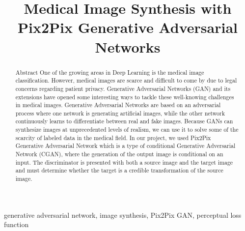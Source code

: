 \documentclass[conference]{IEEEtran}
\begin{document}
\title{Medical Image Synthesis with \\Pix2Pix Generative Adversarial Networks}


\author{
\and
{}
\and
{}
}

\maketitle

\begin{abstract}
    Abstract
One of the growing areas in Deep Learning is the medical image classification. However, medical images are scarce and difficult to come by due to legal concerns regarding patient privacy.  Generative Adversarial Networks (GAN) and its extensions have opened some interesting ways to tackle these well-knowing challenges in medical images.
Generative Adversarial Networks are based on an adversarial process where one network is generating artificial images, while the other network continuously learns to differentiate between real and fake images. Because GANs can synthesize images at unprecedented levels of realism, we can use it to solve some of the scarcity of labeled data in the medical field. 
In our project, we used Pix2Pix Generative Adversarial Network which is a type of conditional Generative Adversarial Network (CGAN), where the generation of the output image is conditional on an input. The discriminator is presented with both a source image and the target image and must determine whether the target is a credible transformation of the source image.
\end{abstract}

\begin{IEEEkeywords}
generative adversarial network, image synthesis, Pix2Pix GAN, perceptual loss function
\end{IEEEkeywords}
\end{document}
